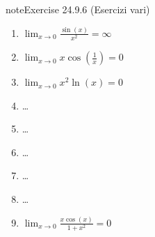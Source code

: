 \documentclass[letterpaper,10pt,italian]{jupyterBook}
\begin{document}
\begin{sphinxadmonition}{note}{Exercise 24.9.6 (Esercizi vari)}
\begin{enumerate}
\item {} 
\sphinxAtStartPar
\(\lim_{x \to 0} \frac{\sin(x)}{x^2} = \infty\)

\item {} 
\sphinxAtStartPar
\(\lim_{x \to 0} x \cos\left(\frac{1}{x}\right) = 0\)

\item {} 
\sphinxAtStartPar
\(\lim_{x \to 0} x^2 \ln(x) = 0\)

\item {} 
\sphinxAtStartPar
…

\item {} 
\sphinxAtStartPar
…

\item {} 
\sphinxAtStartPar
…

\item {} 
\sphinxAtStartPar
…

\item {} 
\sphinxAtStartPar
…

\item {} 
\sphinxAtStartPar
\(\lim_{x \to 0} \frac{x \cos(x)}{1 + x^2} = 0\)

\end{enumerate}
\end{sphinxadmonition}
\end{document}
